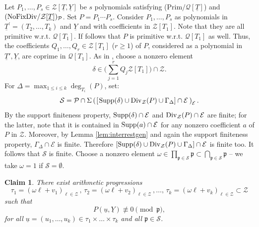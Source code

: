 \documentclass[11pt,a4paper,reqno]{amsart}
\newtheorem{claim}{Claim}
\theoremstyle{definition}
\begin{document}
Let $P_1,\ldots,P_s \in {\mathcal Z}[\underline{T},\underline{Y}]$ be $s$ polynomials satisfying (Prim$/{\mathcal Q}[\underline T]$) and $\hbox{\rm (NoFixDiv}/{\mathcal Z}[\underline T])_{\mathcal P}$. Set $P=P_1 \cdots P_s$. Consider $P_1,\ldots,P_s$ as polynomials in $\underline{T}^\prime=(T_2,\dots,T_k)$ and $\underline{Y}$ and with coefficients in $\mathcal{Z}[T_1]$. Note that they are all primitive \hbox{w.r.t.} $\mathcal{Q}[T_1]$. If follows that $P$ is primitive \hbox{w.r.t.} $\mathcal{Q}[T_1]$ as well. Thus, the coefficients $Q_1,\dots,Q_r \in \mathcal{Z}[T_1]$ ($r \geq 1$) of $P$, considered as a polynomial in $\underline{T}',\underline{Y}$, are coprime in $\mathcal{Q}[T_1]$. As in \cite[\S 2.1]{BDKN22}, choose a nonzero element 
$$\delta\in \Biggl( \sum_{j=1}^{r} Q_{j}\mathcal{Z}[T_1] \Biggl) \cap \mathcal{Z}.
$$   
For $\Delta=\max_{1 \leq i \leq k}\deg_{T_i}(P)$, set: 
 \begin{equation}\label{eq:ererer}
\mathcal{S}=\mathcal{P} \cap \Sigma\left(\hskip 1pt [\hskip 1pt {\rm Supp}(\delta) \cup {\rm Div}_{\mathcal{Z}}(P) \cup \Gamma_\Delta] \cap \mathcal{E}\hskip 2pt \right)_{\mathcal{E}}. 
 \end{equation}
 By the support finiteness property, ${\rm Supp}(\delta) \cap \mathcal{E}$ and ${\rm Div}_{\mathcal{Z}}(P) \cap \mathcal{E}$ are finite; for the latter, note that it is contained in ${\rm Supp}(a) \cap \mathcal{E}$ for any nonzero coefficient $a$ of $P$ in $\mathcal{Z}$. Moreover, by Lemma \ref{lem:interrestgen} and again the support finiteness property, $\Gamma_{\Delta} \cap \mathcal{E}$ is finite. Therefore $[{\rm Supp}(\delta) \cup {\rm Div}_{\mathcal{Z}}(P) \cup \Gamma_\Delta] \cap \mathcal{E}$ is finite too. It follows that $\mathcal{S}$ is finite. Choose a nonzero element $\omega \in \prod_{\mathfrak{p} \in \mathcal{S}} \mathfrak{p} \subset \bigcap_{\mathfrak{p} \in \mathcal{S}} \mathfrak{p}$ -- we take $\omega=1$ if $\mathcal{S}=\emptyset$.
\begin{claim}\label{clm:1lem11we}
There exist arithmetic progressions
$$
\tau_1= (\omega \ell + v_{1})_{\ell\in \mathcal{Z}}\,,\, \tau_2= (\omega \ell + v_{2})_{\ell\in \mathcal{Z}}\,, \dots,\, \tau_k= (\omega \ell + v_{k})_{\ell\in \mathcal{Z}} \subset \mathcal{Z}
$$ such that
\begin{equation}
P(\underline u,\underline{Y}) \not\equiv 0 \pmod{\mathfrak{p}},
\end{equation}
for all $\underline{u}=(u_1,\dots,u_k) \in \tau_1 \times \dots \times \tau_k$ and all $\mathfrak{p} \in \mathcal{S}$.
\end{claim}
\end{document}
